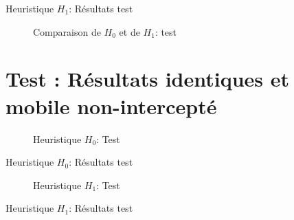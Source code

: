   \begin{table}[H]
    \centering
    
    \caption{Heuristique $H_1$: Résultats test }
    \label{tab:H1_1}
  \end{table}

  \begin{figure}[H]
    \centering
    \begin{tikzpicture}[yscale=0.5]
      
    \end{tikzpicture}
    \caption{Comparaison de $H_0$ et de $H_1$: test }
    \label{fig:comp_1}
  \end{figure}

\section{Test : Résultats identiques et mobile non-intercepté}

  \begin{figure}[H]
    \begin{center}
      \boxed{
      \begin{tikzpicture}[scale=1]
        
      \end{tikzpicture}}
    \end{center}
    \caption{Heuristique $H_0$: Test }
    \label{fig:H0_2}
  \end{figure}

  \begin{table}[H]
    \centering
    
    \caption{Heuristique $H_0$: Résultats test }
    \label{tab:H0_2}
  \end{table}

  \begin{figure}[H]
    \begin{center}
      \boxed{
      \begin{tikzpicture}[scale=1]
        
      \end{tikzpicture}}
    \end{center}
    \caption{Heuristique $H_1$: Test }
    \label{fig:H1_2}
  \end{figure}

  \begin{table}[H]
    \centering
    
    \caption{Heuristique $H_1$: Résultats test }
    \label{tab:H1_2}
  \end{table}

